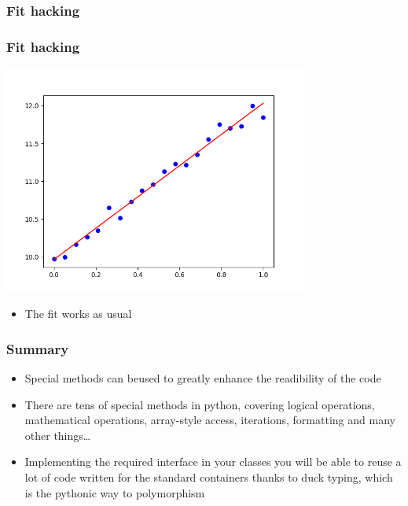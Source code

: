 \documentclass[9pt]{beamer}
\begin{document}
\begin{frame}
  \frametitle{Fit hacking}
  
\end{frame}


\begin{frame}
  \frametitle{Fit hacking}
  \centering
  \includegraphics[width=0.75\textwidth]{fit_with_custom_callable.png}
  
  \medskip
  
  \begin{itemize}
    \item The fit works as usual
   \end{itemize}  
\end{frame}



\begin{frame}
  \frametitle{Summary}
  \begin{itemize}
    \item Special methods can beused to greatly enhance the readibility of the code
    \bigskip
    \item There are tens of special methods in python, covering logical operations,
          mathematical operations, array-style access, iterations, formatting and
          many other things\dots
    \bigskip
    \item Implementing the required interface in your classes you will be able
          to reuse a lot of code written for the standard containers thanks to
          duck typing, which is the pythonic way to polymorphism
   \end{itemize}  
\end{frame}
\end{document}
